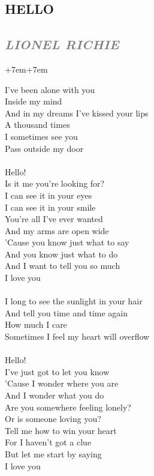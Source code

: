 \documentclass[100pt,a4paper]{report}
\newenvironment{song1}[3]
	{
			\begin{spacing}{0.6}
				\section*{\LARGE\centering \MakeUppercase{\textbf{{#1}}}}
				\subsection*{\Large\centering \textit{\textcolor{gray}{\MakeUppercase{{#2}}}}}
			\end{spacing}
			\vspace{0.8cm}
			\begin{adjustwidth}{+7em}{+7em}
			\Large
			
	}
	{
		\end{adjustwidth}
		\newpage
    }
\begin{document}
\begin{song1}{Hello}{Lionel Richie}
\noindent
I've been alone with you\\
Inside my mind\\
And in my dreams I've kissed your lips\\
A thousand times\\
I sometimes see you\\
Pass outside my door\\
\\
Hello!\\
Is it me you're looking for?\\
I can see it in your eyes\\
I can see it in your smile\\
You're all I've ever wanted\\
And my arms are open wide\\
'Cause you know just what to say\\
And you know just what to do\\
And I want to tell you so much\\
I love you\\
\\
I long to see the sunlight in your hair\\
And tell you time and time again\\
How much I care\\
Sometimes I feel my heart will overflow\\
\\
Hello!\\
I've just got to let you know\\
'Cause I wonder where you are\\
And I wonder what you do\\
Are you somewhere feeling lonely?\\
Or is someone loving you?\\
Tell me how to win your heart\\
For I haven't got a clue\\
But let me start by saying\\
I love you
\end{song1}
\end{document}
